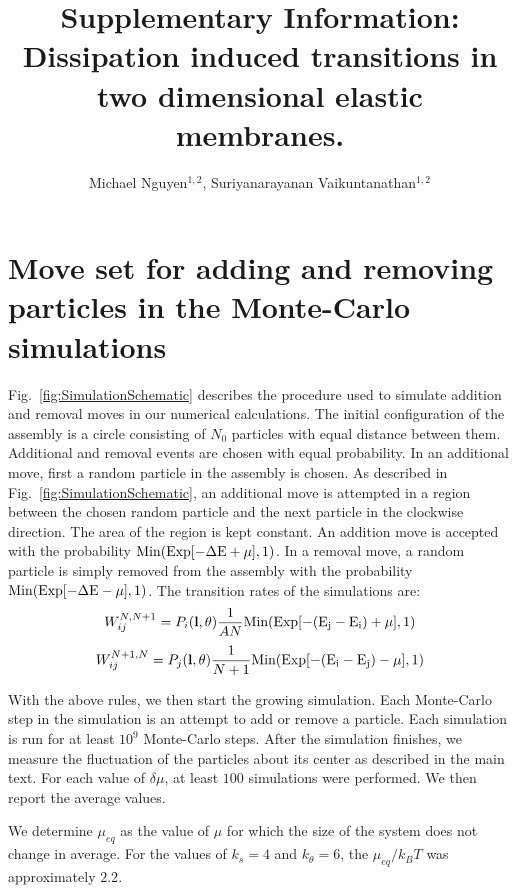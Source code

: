 \documentclass[amsmath,preprintnumbers,10pt,nofootinbib,prl,twocolumn]{revtex4-1}
\begin{document}
\title{Supplementary Information: Dissipation induced transitions in two dimensional elastic membranes.}
\author{Michael Nguyen$^{1,2}$, Suriyanarayanan Vaikuntanathan$^{1,2}$} 
\maketitle
\section{Move set for adding and removing particles in the Monte-Carlo simulations}
Fig.~\ref{fig:SimulationSchematic} describes the procedure used to simulate addition and removal moves in our numerical calculations. The initial configuration of the assembly is a circle consisting of $N_0$ particles with equal distance between them. Additional and removal events are chosen with equal probability. In an additional move, first a random particle in the assembly is chosen. As described in Fig.~\ref{fig:SimulationSchematic}, an additional move is attempted in a region between the chosen random particle and the next particle in the clockwise direction. The area of the region is kept constant.  An addition move is  accepted with the probability $\rm{Min}(\rm{Exp}[-\Delta E +\mu],1)$. In a removal move,  a random particle is simply removed from the assembly with the probability $\rm{Min}(\rm{Exp}[-\Delta E -\mu],1)$. The transition rates of the simulations are:
\begin{equation}
W^{N,N+1}_{ij}=P_i(\bold{l},\bold{\theta})\frac{1}{AN}\rm{Min(Exp[-(E_j - E_i)+\mu],1)}
\end{equation}
\begin{equation}
W^{N+1,N}_{ij}=P_j(\bold{l},\bold{\theta})\frac{1}{N+1}\rm{Min(Exp[-(E_i - E_j)-\mu],1)}
\end{equation}

With the above rules, we then start the growing simulation. Each Monte-Carlo step in the simulation is an attempt to add or remove a particle. Each simulation is run for at least $10^9$ Monte-Carlo steps. After the simulation finishes, we measure the fluctuation of the particles about its center as described in the main text. For each value of $\delta\mu$, at least $100$ simulations were performed. We then report the average values.

We determine $\mu_{eq}$ as the value of $\mu$ for which the size of the system does not change in average. For the values of $k_s=4$ and $k_\theta$$=6$, the $\mu_{eq}/k_BT $ was approximately $2.2$.
\end{document}
